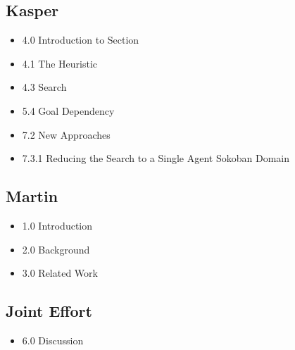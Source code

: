 \documentclass[10pt,a4paper]{article}
\begin{document}
	\subsection{Kasper}
		\begin{itemize}
			\item 4.0 Introduction to Section
			\item 4.1 The Heuristic
			\item 4.3 Search
			\item 5.4 Goal Dependency
			\item 7.2 New Approaches
			\item 7.3.1 Reducing the Search to a Single Agent Sokoban Domain
		\end{itemize}
	\subsection{Martin}
		\begin{itemize}
			\item 1.0 Introduction
			\item 2.0 Background
			\item 3.0 Related Work
		\end{itemize}

	\subsection{Joint Effort}
		\begin{itemize}
			\item 6.0 Discussion
		\end{itemize}





\pagebreak

\pagebreak
\end{document}
